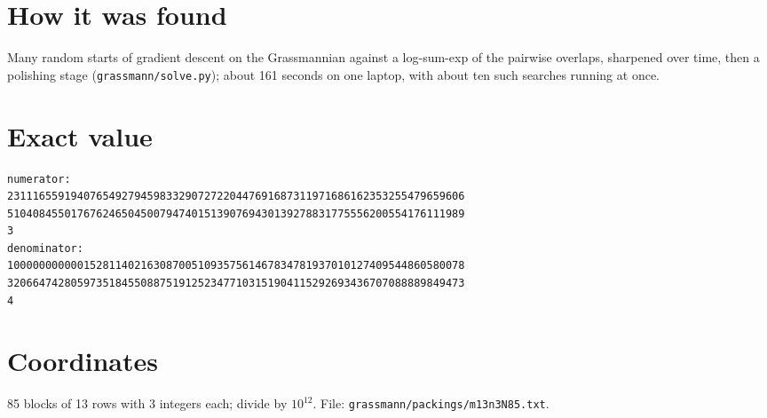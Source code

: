 \documentclass[11pt,a4paper]{article}
\begin{document}
\section{How it was found}
Many random starts of gradient descent on the Grassmannian against a log-sum-exp of the pairwise overlaps, sharpened over time, then a polishing stage (\texttt{grassmann/solve.py}); about 161 seconds on one laptop, with about ten such searches running at once.


\appendix
\section{Exact value}
{\small
\begin{verbatim}
numerator:
231116559194076549279459833290727220447691687311971686162353255479659606
510408455017676246504500794740151390769430139278831775556200554176111989
3
denominator:
100000000000152811402163087005109357561467834781937010127409544860580078
320664742805973518455088751912523477103151904115292693436707088889849473
4
\end{verbatim}}

\section{Coordinates}
85 blocks of 13 rows with 3 integers each; divide by $10^{12}$. File: \texttt{grassmann/packings/m13n3N85.txt}.
{\tiny
\begin{multicols}{3}
\end{multicols}}
\end{document}
